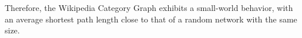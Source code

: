 Therefore, the Wikipedia Category Graph exhibits a small-world behavior, with an average shortest path length close to that of a random network with the same size.




